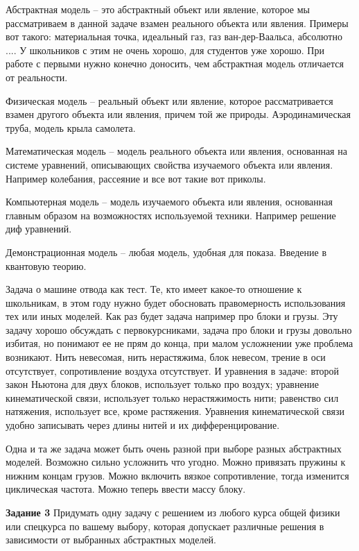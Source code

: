\documentclass[a4paper, 12pt]{article}
\begin{document}
Абстрактная модель -- это абстрактный объект или явление, которое мы 
рассматриваем в данной задаче взамен реального объекта или явления. 
Примеры вот такого: материальная точка, идеальный газ, газ 
ван-дер-Ваальса, абсолютно .... У школьников с этим не очень хорошо, для 
студентов уже хорошо. При работе с первыми нужно конечно доносить, чем 
абстрактная модель отличается от реальности.

Физическая модель -- реальный объект или явление, которое 
рассматривается взамен другого объекта или явления, причем той же 
природы. Аэродинамическая труба, модель крыла самолета.

Математическая модель -- модель реального объекта или явления, 
основанная на системе уравнений, описывающих свойства изучаемого объекта 
или явления. Например колебания, рассеяние и все вот такие вот приколы.

Компьютерная модель -- модель изучаемого объекта или явления, основанная 
главным образом на возможностях используемой техники. Например решение 
диф уравнений.

Демонстрационная модель -- любая модель, удобная для показа. Введение 
в квантовую теорию.

Задача о машине отвода как тест. Те, кто имеет какое-то отношение 
к школьникам, в этом году нужно будет обосновать правомерность 
использования тех или иных моделей. Как раз будет задача например про 
блоки и грузы. Эту задачу хорошо обсуждать с первокурсниками, задача про 
блоки и грузы довольно избитая, но понимают ее не прям до конца, при 
малом усложнении уже проблема возникают. Нить невесомая, нить 
нерастяжима, блок невесом, трение в оси отсутствует, сопротивление 
воздуха отсутствует. И уравнения в задаче: второй закон Ньютона для двух 
блоков, использует только про воздух; уравнение кинематической связи, 
использует только нерастяжимость нити; равенство сил натяжения, 
использует все, кроме растяжения. Уравнения кинематической связи удобно 
записывать через длины нитей и их дифференцирование.

Одна и та же задача может быть очень разной при выборе разных 
абстрактных моделей. Возможно сильно усложнить что угодно. Можно 
привязать пружины к нижним концам грузов. Можно включить вязкое 
сопротивление, тогда изменится циклическая частота. Можно теперь ввести 
массу блоку.

\textbf{Задание 3} Придумать одну задачу с решением из любого курса 
общей физики или спецкурса по вашему выбору, которая допускает различные 
решения в зависимости от выбранных абстрактных моделей.
\end{document}
